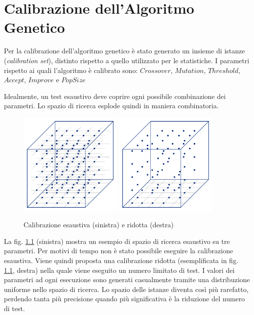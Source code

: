 \documentclass[a4paper, 10pt]{report}
\begin{document}
\appendix
\chapter{Calibrazione dell'Algoritmo Genetico}
\label{app:calibration}
Per la calibrazione dell'algoritmo genetico è stato generato un insieme
di istanze (\emph{calibration set}), distinto rispetto a quello utilizzato
per le statistiche. I parametri rispetto ai quali l'algoritmo è calibrato
sono: $Crossover$, $Mutation$, $Threshold$, $Accept$, $Improve$ e $PopSize$

Idealmente, un test esaustivo deve coprire ogni possibile combinazione
dei parametri. Lo spazio di ricerca esplode quindi in maniera combinatoria.

\begin{figure}
  \centering
  \includegraphics[width=0.45\textwidth]{images/fig-exaustive-training-set}
  \includegraphics[width=0.45\textwidth]{images/fig-reduced-training-set}
  \caption{Calibrazione esaustiva (sinistra) e ridotta (destra)}
  \label{fig:calibration}
\end{figure}

La fig. \ref{fig:calibration} (sinistra) mostra un esempio di spazio di
ricerca esaustivo su tre parametri. Per motivi di tempo non è stato
possibile eseguire la calibrazione esaustiva. Viene quindi proposta una
calibrazione ridotta (esemplificata in fig. \ref{fig:calibration}, destra)
nella quale viene eseguito un numero limitato di test. I valori dei
parametri ad ogni esecuzione sono generati casualmente tramite una
distribuzione uniforme nello spazio di ricerca. Lo spazio delle istanze
diventa così più rarefatto, perdendo tanta più precisione quando più
significativa è la riduzione del numero di test.
\end{document}
